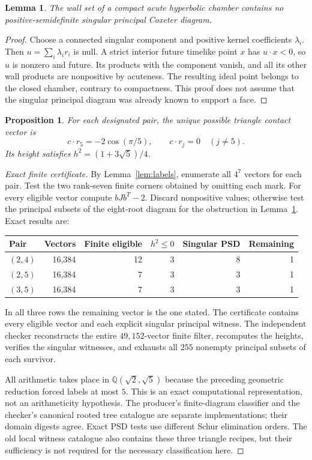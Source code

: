 \documentclass[11pt]{article}
\newtheorem{lemma}[theorem]{Lemma}
\newtheorem{proposition}[theorem]{Proposition}
\newcommand{\Q}{\mathbb Q}
\begin{document}
\begin{lemma}\label{lem:affine}
The wall set of a compact acute hyperbolic chamber contains no
positive-semidefinite singular principal Coxeter diagram.
\end{lemma}
\begin{proof}
Choose a connected singular component and positive kernel coefficients
$\lambda_i$. Then $u=\sum_i\lambda_i r_i$ is null. A strict interior
future timelike point $x$ has $u\cdot x<0$, so $u$ is nonzero and future.
Its products with the component vanish, and all its other wall products
are nonpositive by acuteness. The resulting ideal point belongs to the
closed chamber, contrary to compactness. This proof does not assume that
the singular principal diagram was already known to support a face.
\end{proof}

\begin{proposition}\label{prop:finite}
For each designated pair, the unique possible triangle contact vector is
\[
c\cdot r_5=-2\cos(\pi/5),\qquad c\cdot r_j=0\quad(j\ne5).
\]
Its height satisfies $h^2=(1+3\sqrt5)/4$.
\end{proposition}
\begin{proof}[Exact finite certificate]
By Lemma~\ref{lem:labels}, enumerate all $4^7$ vectors for each pair.
Test the two rank-seven finite corners obtained by omitting each mark.
For every eligible vector compute $bJb^T-2$. Discard nonpositive values;
otherwise test the principal subsets of the eight-root diagram for the
obstruction in Lemma~\ref{lem:affine}. Exact results are:
\begin{center}
\begin{tabular}{lrrrrr}
\toprule
Pair & Vectors & Finite eligible & $h^2\le0$ & Singular PSD & Remaining\\
\midrule
$(2,4)$ & 16,384 & 12 & 3 & 8 & 1\\
$(2,5)$ & 16,384 & 7 & 3 & 3 & 1\\
$(3,5)$ & 16,384 & 7 & 3 & 3 & 1\\
\bottomrule
\end{tabular}
\end{center}
In all three rows the remaining vector is the one stated. The certificate
contains every eligible vector and each explicit singular principal
witness. The independent checker reconstructs the entire $49,152$-vector
finite filter, recomputes the heights, verifies the singular witnesses,
and exhausts all $255$ nonempty principal subsets of each survivor.

All arithmetic takes place in $\Q(\sqrt2,\sqrt5)$ because the preceding
geometric reduction forced labels at most $5$. This is an exact
computational representation, not an arithmeticity hypothesis. The
producer's finite-diagram classifier and the checker's canonical rooted
tree catalogue are separate implementations; their domain digests agree.
Exact PSD tests use different Schur elimination orders. The old local
witness catalogue also contains these three triangle recipes, but their
sufficiency is not required for the necessary classification here.
\end{proof}
\end{document}
